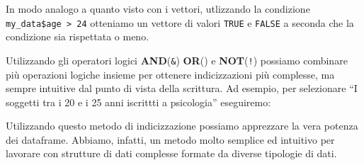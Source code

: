 \documentclass[
]{book}
\newenvironment{Shaded}{\begin{snugshade}}{\end{snugshade}}
\newcommand{\CommentTok}[1]{\textcolor[rgb]{0.56,0.35,0.01}{\textit{#1}}}
\newcommand{\DecValTok}[1]{\textcolor[rgb]{0.00,0.00,0.81}{#1}}
\newcommand{\NormalTok}[1]{#1}
\newcommand{\OperatorTok}[1]{\textcolor[rgb]{0.81,0.36,0.00}{\textbf{#1}}}
\newcommand{\StringTok}[1]{\textcolor[rgb]{0.31,0.60,0.02}{#1}}
\begin{document}
In modo analogo a quanto visto con i vettori, utlizzando la condizione \texttt{my\_data\$age\ \textgreater{}\ 24} otteniamo un vettore di valori \texttt{TRUE} e \texttt{FALSE} a seconda che la condizione sia rispettata o meno.

Utilizzando gli operatori logici \textbf{AND}(\texttt{\&}) \textbf{OR}(\texttt{\textbar{}}) e \textbf{NOT}(\texttt{!}) possiamo combinare più operazioni logiche insieme per ottenere indicizzazioni più complesse, ma sempre intuitive dal punto di vista della scrittura. Ad esempio, per selezionare ``I soggetti tra i 20 e i 25 anni iscrittti a psicologia'' eseguiremo:

\begin{Shaded}
\end{Shaded}

Utilizzando questo metodo di indicizzazione possiamo apprezzare la vera potenza dei dataframe. Abbiamo, infatti, un metodo molto semplice ed intuitivo per lavorare con strutture di dati complesse formate da diverse tipologie di dati.
\end{document}
